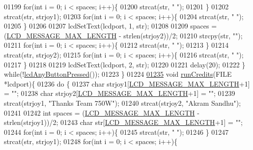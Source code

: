\begin{DoxyCode}
{{{{{{{{{{{{{{{{01199         \textcolor{keywordflow}{for}(\textcolor{keywordtype}{int} i = 0; i < spaces; i++)\{
01200             strcat(str, \textcolor{stringliteral}{" "});
01201         \}
01202         strcat(str, strjoy1);
01203         \textcolor{keywordflow}{for}(\textcolor{keywordtype}{int} i = 0; i < spaces; i++)\{
01204             strcat(str, \textcolor{stringliteral}{" "});
01205         \}
01206 
01207         lcdSetText(lcdport, 1, str);
01208 
01209         spaces = (\hyperlink{lcdmsg_8h_abe4c4b70fc6f44ae3680e5b2c68cdd00}{LCD\_MESSAGE\_MAX\_LENGTH} - strlen(strjoy2))/2;
01210         strcpy(str, \textcolor{stringliteral}{""});
01211         \textcolor{keywordflow}{for}(\textcolor{keywordtype}{int} i = 0; i < spaces; i++)\{
01212             strcat(str, \textcolor{stringliteral}{" "});
01213         \}
01214         strcat(str, strjoy2);
01215         \textcolor{keywordflow}{for}(\textcolor{keywordtype}{int} i = 0; i < spaces; i++)\{
01216             strcat(str, \textcolor{stringliteral}{" "});
01217         \}
01218 
01219         lcdSetText(lcdport, 2, str);
01220 
01221         delay(20);
01222     \} \textcolor{keywordflow}{while}(!\hyperlink{lcddiag_8h_a0592813f995bfeeadb9bee923833ed35}{lcdAnyButtonPressed}());
01223 \}
01224 
\hypertarget{lcddiag_8c_source.tex_l01235}{}\hyperlink{lcddiag_8c_a636890926de259e3f0869b8f4c4789c3}{01235} \textcolor{keywordtype}{void} \hyperlink{lcddiag_8c_a636890926de259e3f0869b8f4c4789c3}{runCredits}(FILE *lcdport)\{
01236     \textcolor{keywordflow}{do} \{
01237         \textcolor{keywordtype}{char} strjoy1[\hyperlink{lcdmsg_8h_abe4c4b70fc6f44ae3680e5b2c68cdd00}{LCD\_MESSAGE\_MAX\_LENGTH}+1] = \textcolor{stringliteral}{""};
01238         \textcolor{keywordtype}{char} strjoy2[\hyperlink{lcdmsg_8h_abe4c4b70fc6f44ae3680e5b2c68cdd00}{LCD\_MESSAGE\_MAX\_LENGTH}+1] = \textcolor{stringliteral}{""};
01239         strcat(strjoy1, \textcolor{stringliteral}{"Thanks Team 750W"});
01240         strcat(strjoy2, \textcolor{stringliteral}{"Akram Sandhu"});
01241 
01242         \textcolor{keywordtype}{int} spaces = (\hyperlink{lcdmsg_8h_abe4c4b70fc6f44ae3680e5b2c68cdd00}{LCD\_MESSAGE\_MAX\_LENGTH} - strlen(strjoy1))/2;
01243         \textcolor{keywordtype}{char} str[\hyperlink{lcdmsg_8h_abe4c4b70fc6f44ae3680e5b2c68cdd00}{LCD\_MESSAGE\_MAX\_LENGTH}+1] = \textcolor{stringliteral}{""};
01244         \textcolor{keywordflow}{for}(\textcolor{keywordtype}{int} i = 0; i < spaces; i++)\{
01245             strcat(str, \textcolor{stringliteral}{" "});
01246         \}
01247         strcat(str, strjoy1);
01248         \textcolor{keywordflow}{for}(\textcolor{keywordtype}{int} i = 0; i < spaces; i++)\{
}}}}}}}}}}}}}}}}
\end{DoxyCode}
